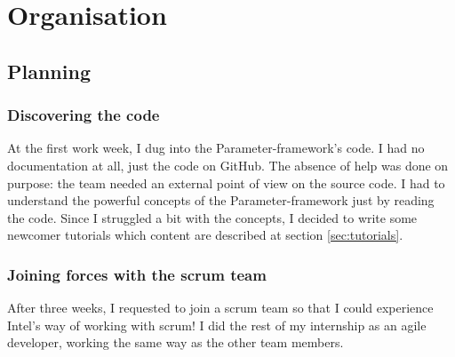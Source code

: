 \chapter{Organisation}\label{chap:organisation}

\section{Planning}
\subsection{Discovering the code}
At the first work week, I dug into the Parameter-framework's code. I had no
documentation at all, just the code on GitHub. The absence of help was done on
purpose: the team needed an external point of view on the source code. I had
to understand the powerful concepts of the Parameter-framework just by reading
the code. Since I struggled a bit with the concepts, I decided to write some
newcomer tutorials which content are described at section \ref{sec:tutorials}.

\subsection{Joining forces with the scrum team}
After three weeks, I requested to join a scrum team so that I could experience
Intel's way of working with scrum! I did the rest of my internship as an agile developer,
working the same way as the other team members.

